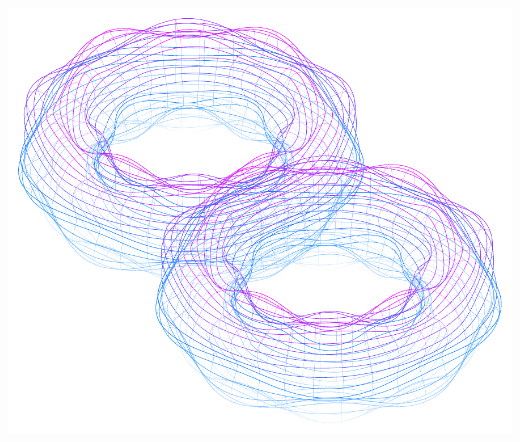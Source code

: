 \documentclass[11pt,openany]{article}
\begin{document}
\begin{center}
\begin{minipage}{.32\textwidth}
	\includegraphics[scale=.35]{../tikz/grad-math-tikz-pdf/double-torus2.pdf}
\end{minipage}
\end{center}
\vfill
\end{document}
